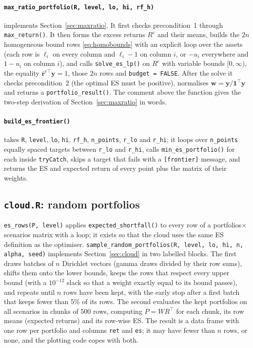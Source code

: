 \documentclass[11pt,a4paper]{article}
\newcommand{\w}{\mathbf{w}}
\newcommand{\y}{\mathbf{y}}
\newcommand{\rr}{\mathbf{r}}
\newcommand{\ones}{\mathbf{1}}
\newcommand{\code}[1]{\texttt{#1}}
\newcommand{\file}[1]{\texttt{#1}}
\theoremstyle{plain}
\theoremstyle{remark}
\begin{document}
\paragraph{\code{max\_ratio\_portfolio(R, level, lo, hi, rf\_h)}} implements
Section~\ref{sec:maxratio}. It first checks precondition~1 through
\code{max\_return()}. It then forms the excess returns $R^{e}$ and their
means, builds the $2n$ homogeneous bound rows \eqref{eq:homobounds} with an
explicit loop over the assets (each row is $\ell_i$ on every column and
$\ell_i - 1$ on column $i$, or $-u_i$ everywhere and $1 - u_i$ on column
$i$), and calls \code{solve\_es\_lp()} on $R^{e}$ with variable bounds
$[0,\infty)$, the equality $\bar{\rr}^{e\top}\y = 1$, those $2n$ rows and
\code{budget = FALSE}. After the solve it checks precondition~2 (the
optimal ES must be positive), normalises $\w = \y/\ones^\top\y$ and returns
a \code{portfolio\_result()}. The comment above the function gives the
two-step derivation of Section~\ref{sec:maxratio} in words.

\paragraph{\code{build\_es\_frontier()}} takes \code{R}, \code{level}, \code{lo}, \code{hi}, \code{rf\_h}, \code{n\_points}, \code{r\_lo} and \code{r\_hi}; it loops over \code{n\_points} equally spaced targets between
\code{r\_lo} and \code{r\_hi}, calls \code{min\_es\_portfolio()} for each
inside \code{tryCatch}, skips a target that fails with a
\code{[frontier]} message, and returns the ES and expected return of every
point plus the matrix of their weights.

\subsection{\file{cloud.R}: random portfolios}

\code{es\_rows(P, level)} applies \code{expected\_shortfall()} to every row of
a portfolios$\times$scenarios matrix with a loop; it exists so that the
cloud uses the same ES definition as the optimiser.
\code{sample\_random\_portfolios(R, level, lo, hi, n, alpha, seed)}
implements Section~\ref{sec:cloud} in two labelled blocks. The first draws
batches of $n$ Dirichlet vectors (gamma draws divided by their row sums),
shifts them onto the lower bounds, keeps the rows that respect every upper
bound (with a $10^{-12}$ slack so that a weight exactly equal to its bound
passes), and repeats until $n$ rows have been kept, with the early stop
after a first batch that keeps fewer than 5\% of its rows. The second
evaluates the kept portfolios on all scenarios in chunks of 500 rows,
computing $P = W R^\top$ for each chunk, its row means (expected returns)
and its row-wise ES. The result is a data frame with one row per portfolio
and columns \code{ret} and \code{es}; it may have fewer than $n$ rows, or
none, and the plotting code copes with both.
\end{document}
